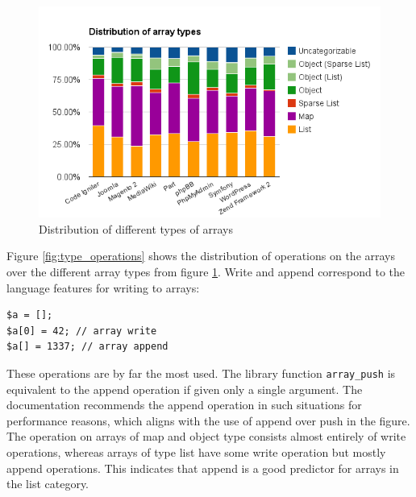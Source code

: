 \begin{figure}[htbp]
\centering
\includegraphics[width=\textwidth]{chapters/study/g1.png}
\caption{Distribution of different types of arrays}
\label{fig:array_types}
\end{figure}

Figure \ref{fig:type_operations} shows the distribution of operations on the arrays over the different array types from figure \ref{fig:array_types}. Write and append correspond to the language features for writing to arrays:

\begin{lstlisting}
$a = [];
$a[0] = 42; // array write
$a[] = 1337; // array append
\end{lstlisting}
These operations are by far the most used. The library function \texttt{array\_push} is equivalent to the append operation if given only a single argument. The documentation recommends the append operation in such situations for performance reasons, which aligns with the use of append over push in the figure. The operation on arrays of map and object type consists almost entirely of write operations, whereas arrays of type list have some write operation but mostly append operations. This indicates that append is a good predictor for arrays in the list category.

